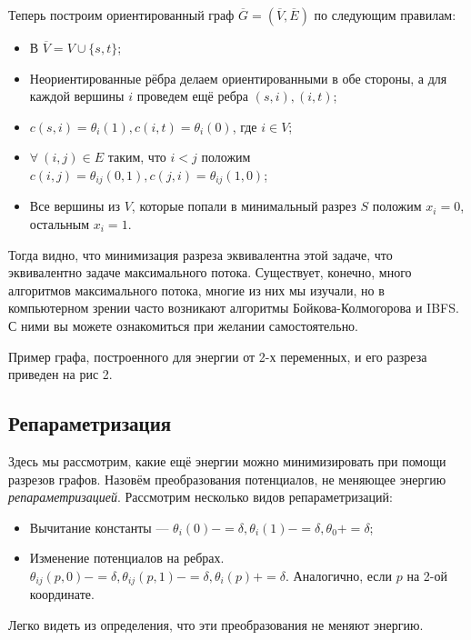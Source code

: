 \documentclass[a4paper, 12pt]{article}
\begin{document}
Теперь построим ориентированный граф $\overline{G} = (\overline{V}, \overline{E})$
по следующим правилам:

\begin{itemize}
  \item В $\overline{V} = V \cup \{s, t\}$;
  \item Неориентированные рёбра делаем ориентированными в обе
  стороны, а для каждой вершины
  $i$ проведем ещё ребра $(s, i), (i, t)$;
  \item $c(s, i) = \theta_i(1), c(i, t) = \theta_i(0)$, где $i \in V$;
  \item $\forall \ (i, j) \in E$ таким, что $i < j$ положим $c(i, j) =\theta_{ij}(0, 1), c(j, i) = \theta_{ij}(1, 0)$;
  \item Все вершины из $V$, которые попали в минимальный разрез $S$ положим $x_i = 0$,
  остальным $x_i = 1$.
\end{itemize}

Тогда видно, что минимизация разреза эквивалентна этой задаче, что эквивалентно
задаче максимального потока. Существует, конечно, много алгоритмов максимального
потока, многие из них мы изучали, но в компьютерном зрении часто возникают алгоритмы
Бойкова-Колмогорова и IBFS. С ними вы можете ознакомиться при желании самостоятельно.

Пример графа, построенного для энергии от 2-х переменных, и его разреза 
приведен на рис 2.

\subsection{Репараметризация}

Здесь мы рассмотрим, какие ещё энергии можно минимизировать при помощи
разрезов графов. Назовём преобразования потенциалов, не меняющее энергию 
\textit{репараметризацией}. Рассмотрим несколько видов репараметризаций:

\begin{itemize}
  \item Вычитание константы --- $\theta_i(0) \mathrel{{-}{=}} \delta, \theta_i(1) \mathrel{{-}{=}} \delta,
  \theta_0 \mathrel{{+}{=}} \delta$;
  \item Изменение потенциалов на ребрах. $\theta_{ij}(p, 0) \mathrel{{-}{=}} \delta, 
  \theta_{ij}(p, 1) \mathrel{{-}{=}} \delta, \theta_i(p) \mathrel{{+}{=}} \delta$. Аналогично, если
  $p$ на 2-ой координате.
\end{itemize}

Легко видеть из определения, что эти преобразования не меняют энергию.
\end{document}
